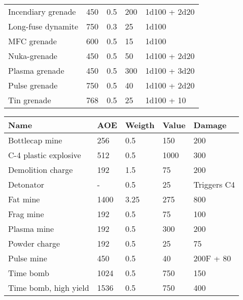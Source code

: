 \documentclass{report}
\begin{document}
\begin{table}[H]
\begin{table}[H]
\begin{table}[H]
\begin{table}[H]
\begin{table}[H]
\begin{table}[H]
\begin{table}[H]
\begin{table}[H]
\begin{table}[H]
\begin{table}[H]
\begin{tabular}{p{30mm}p{30mm}p{30mm}p{30mm}p{30mm}}
Incendiary grenade  & 450 & 0.5  & 200 & 1d100 + 2d20 \\
Long-fuse dynamite  & 750 & 0.3  & 25 & 1d100 \\
MFC grenade  & 600 & 0.5  & 15 & 1d100 \\
Nuka-grenade  & 450 & 0.5  & 50 & 1d100 + 2d20 \\
Plasma grenade  & 450 & 0.5  & 300 & 1d100 + 3d20 \\
Pulse grenade  & 750 & 0.5  & 40 & 1d100 + 2d20 \\
Tin grenade  & 768 & 0.5  & 25 & 1d100 + 10 \\
  \end{tabular}
\begin{table}[H]
  \centering
  \begin{tabular}{p{30mm}p{30mm}p{30mm}p{30mm}p{30mm}}
\bfseries Name & \bfseries AOE & \bfseries Weigth & \bfseries Value & \bfseries Damage  \\
\hline
Bottlecap mine  & 256 & 0.5  & 150 & 200 \\
C-4 plastic explosive  & 512 & 0.5  & 1000 & 300 \\
Demolition charge  & 192 & 1.5  & 75 & 200 \\
Detonator  & -  & 0.5  & 25 & Triggers C4 \\
Fat mine  & 1400 & 3.25  & 275 & 800 \\
Frag mine  & 192 & 0.5  & 75 & 100 \\
Plasma mine  & 192 & 0.5  & 300 & 200 \\
Powder charge  & 192 & 0.5  & 25 & 75 \\
Pulse mine  & 450 & 0.5  & 40 & 200F + 80 \\
Time bomb  & 1024 & 0.5  & 750 & 150 \\
Time bomb, high yield  & 1536 & 0.5  & 750 & 400 \\
  \end{tabular}

\end{table}
\end{table}
\end{table}
\end{table}
\end{table}
\end{table}
\end{table}
\end{table}
\end{table}
\end{table}
\end{table}
\end{document}
